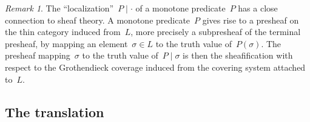 \documentclass[com,11pt,crcready]{iosart2x}
\theoremstyle{definition}
\theoremstyle{plain}
\theoremstyle{remark}
\newtheorem{remark}[definition]{Remark}
\newcommand{\?}{\,{:}\,}
\renewcommand{\_}{\mathpunct{.}\,}
\begin{document}
\begin{remark}The ``localization''~$P \mid \cdot$ of a monotone predicate~$P$
has a close connection to sheaf theory. A monotone
predicate~$P$ gives rise to a presheaf on the thin category induced from~$L$,
more precisely a subpresheaf of the terminal presheaf, by mapping an
element~$\sigma \in L$ to the truth value of~$P(\sigma)$. The presheaf
mapping~$\sigma$ to the truth value of~$P \mid \sigma$ is then the
sheafification with respect to the Grothendieck coverage induced from the
covering system attached to~$L$.\end{remark}








\subsection{The translation}
\end{document}
